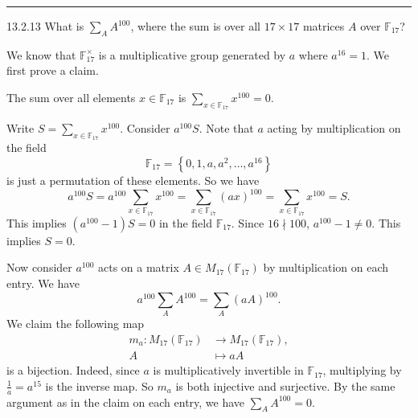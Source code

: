 \documentclass[a4paper, 12pt]{article}
\begin{document}
\noindent\rule{7in}{2.8pt}
\begin{problem}{13.2.13}
What is \(\sum_A A^{100}\), where the sum is over all \(17\times 17\) matrices \(A\) over \(\mathbb{F}_{17}\)?
\end{problem}
\begin{solution}
We know that \(\mathbb{F}_{17}^\times\) is a multiplicative group generated by \(a\) where \(a^{16}=1\).  We first prove a claim. 
\begin{claim}
The sum over all elements \(x\in \mathbb{F}_{17}\) is \(\sum_{x\in \mathbb{F}_{17}}x^{100}=0\).
\end{claim}
\begin{claimproof}
Write \(S=\sum_{x\in \mathbb{F}_{17}}x^{100}\). Consider \(a^{100}S\). Note that \(a\) acting by multiplication on the field 
\[\mathbb{F}_{17}=\left\{ 0,1,a,a^2,\ldots,a^{16} \right\}\]
is just a permutation of these elements. So we have 
\[a^{100}S=a^{100}\sum_{x\in \mathbb{F}_{17}}x^{100}=\sum_{x\in \mathbb{F}_{17}} (ax)^{100}=\sum_{x\in \mathbb{F}_{17}}x^{100}=S.\]
This implies \((a^{100}-1)S=0\) in the field \(\mathbb{F}_{17}\). Since \(16\nmid 100\), \(a^{100}-1\neq 0\). This implies \(S=0\).
\end{claimproof}

Now consider \(a^{100}\) acts on a matrix \(A\in M_{17}(\mathbb{F}_{17})\) by multiplication on each entry. We have 
\[a^{100}\sum_A A^{100}=\sum_A (aA)^{100}.\]
We claim the following map 
\begin{align*}
    m_a:M_{17}(\mathbb{F}_{17})&\rightarrow M_{17}(\mathbb{F}_{17}),\\ 
        A&\mapsto aA
\end{align*}
is a bijection. Indeed, since \(a\) is multiplicatively invertible in \(\mathbb{F}_{17}\), multiplying by \(\frac{1}{a}=a^{15}\) is the inverse map. So \(m_a\) is both injective and surjective. 
By the same argument as in the claim on each entry, we have \(\sum_A A^{100}=0\).
\end{solution}
\end{document}
